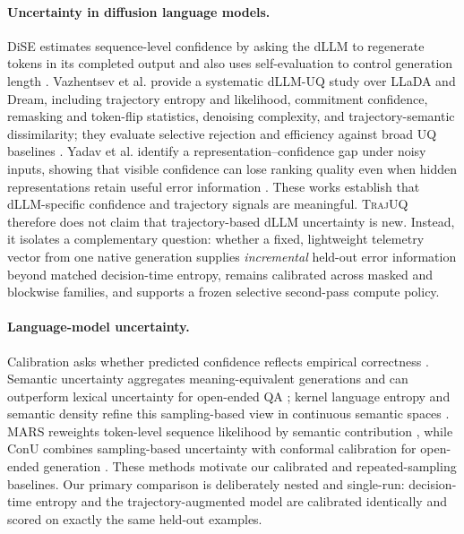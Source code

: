 \documentclass[10pt]{article}
\newcommand{\method}{\textsc{TrajUQ}\xspace}
\begin{document}
\paragraph{Uncertainty in diffusion language models.}
DiSE estimates sequence-level confidence by asking the dLLM to regenerate tokens in its completed output and also uses self-evaluation to control generation length \citep{zhong2026dise}. Vazhentsev et al. provide a systematic dLLM-UQ study over LLaDA and Dream, including trajectory entropy and likelihood, commitment confidence, remasking and token-flip statistics, denoising complexity, and trajectory-semantic dissimilarity; they evaluate selective rejection and efficiency against broad UQ baselines \citep{vazhentsev2026dllmuq}. Yadav et al. identify a representation--confidence gap under noisy inputs, showing that visible confidence can lose ranking quality even when hidden representations retain useful error information \citep{yadav2026unsure}. These works establish that dLLM-specific confidence and trajectory signals are meaningful. \method therefore does not claim that trajectory-based dLLM uncertainty is new. Instead, it isolates a complementary question: whether a fixed, lightweight telemetry vector from one native generation supplies \emph{incremental} held-out error information beyond matched decision-time entropy, remains calibrated across masked and blockwise families, and supports a frozen selective second-pass compute policy.

\paragraph{Language-model uncertainty.}
Calibration asks whether predicted confidence reflects empirical correctness \citep{guo2017calibration,jiang2021know}.
Semantic uncertainty aggregates meaning-equivalent generations and can outperform lexical uncertainty for open-ended QA \citep{kuhn2023semantic,farquhar2024semantic}; kernel language entropy and semantic density refine this sampling-based view in continuous semantic spaces \citep{nikitin2024kernel,qiu2024density}. MARS reweights token-level sequence likelihood by semantic contribution \citep{bakman2024mars}, while ConU combines sampling-based uncertainty with conformal calibration for open-ended generation \citep{wang2024conu}. These methods motivate our calibrated and repeated-sampling baselines. Our primary comparison is deliberately nested and single-run: decision-time entropy and the trajectory-augmented model are calibrated identically and scored on exactly the same held-out examples.
\end{document}
